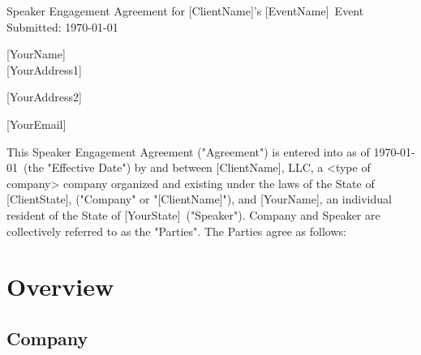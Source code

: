 \documentclass[a4paper,12pt]{article} %
\newcommand{\YourName}{[YourName]}
\newcommand{\AddressLineOne}{[YourAddress1]}
\newcommand{\AddressLineTwo}{[YourAddress2]}
\newcommand{\YourEmail}{[YourEmail]}
\newcommand{\YourState}{[YourState]}
\newcommand{\ClientName}{[ClientName]}
\newcommand{\ClientState}{[ClientState]}
\newcommand{\EventName}{[EventName]}
\begin{document}

\begin{titlepage}

\vspace*{\fill} %

\begin{center}

{\LARGE Speaker Engagement Agreement for \ClientName's \EventName  ~Event}\\ [1.5cm]

Submitted: \today

\end{center}

\YourName\\

\AddressLineOne

\AddressLineTwo

\YourEmail

\vspace*{\fill} %

\end{titlepage}


This Speaker Engagement Agreement ("Agreement") is entered into as of \today ~(the "Effective Date") by and between \ClientName, LLC, a <type of company> company organized and existing under the laws of the State of \ClientState, ("Company" or "\ClientName"), and \YourName, an individual resident of the State of \YourState ~("Speaker"). Company and Speaker are collectively referred to as the "Parties". The Parties agree as follows:


\section{Overview}

\subsection{Company}
\end{document}
